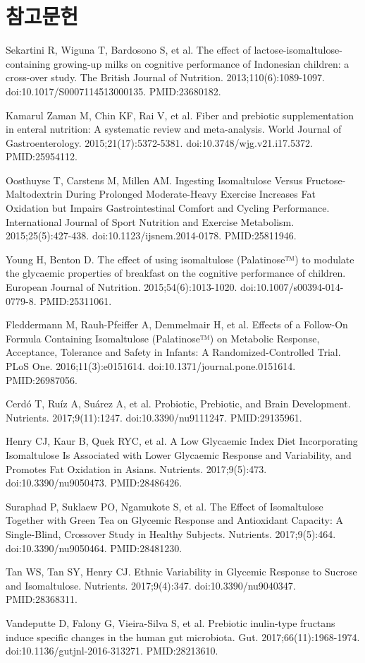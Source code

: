 \documentclass[11pt,oneside]{book}
\newcommand{\refstart}{\par\begingroup\footnotesize\setlength{\parskip}{2.5pt}\raggedright}
\newcommand{\reff}[2]{\par\hangindent=7mm\hangafter=1\noindent[#1]\hspace{2mm}#2\par}
\begin{document}
\section*{참고문헌}
\refstart
\reff{1}{Sekartini R, Wiguna T, Bardosono S, et al. The effect of lactose-isomaltulose-containing growing-up milks on cognitive performance of Indonesian children: a cross-over study. The British Journal of Nutrition. 2013;110(6):1089-1097. doi:10.1017/S0007114513000135. PMID:23680182.}
\reff{2}{Kamarul Zaman M, Chin KF, Rai V, et al. Fiber and prebiotic supplementation in enteral nutrition: A systematic review and meta-analysis. World Journal of Gastroenterology. 2015;21(17):5372-5381. doi:10.3748/wjg.v21.i17.5372. PMID:25954112.}
\reff{3}{Oosthuyse T, Carstens M, Millen AM. Ingesting Isomaltulose Versus Fructose-Maltodextrin During Prolonged Moderate-Heavy Exercise Increases Fat Oxidation but Impairs Gastrointestinal Comfort and Cycling Performance. International Journal of Sport Nutrition and Exercise Metabolism. 2015;25(5):427-438. doi:10.1123/ijsnem.2014-0178. PMID:25811946.}
\reff{4}{Young H, Benton D. The effect of using isomaltulose (Palatinose™) to modulate the glycaemic properties of breakfast on the cognitive performance of children. European Journal of Nutrition. 2015;54(6):1013-1020. doi:10.1007/s00394-014-0779-8. PMID:25311061.}
\reff{5}{Fleddermann M, Rauh-Pfeiffer A, Demmelmair H, et al. Effects of a Follow-On Formula Containing Isomaltulose (Palatinose™) on Metabolic Response, Acceptance, Tolerance and Safety in Infants: A Randomized-Controlled Trial. PLoS One. 2016;11(3):e0151614. doi:10.1371/journal.pone.0151614. PMID:26987056.}
\reff{6}{Cerdó T, Ruíz A, Suárez A, et al. Probiotic, Prebiotic, and Brain Development. Nutrients. 2017;9(11):1247. doi:10.3390/nu9111247. PMID:29135961.}
\reff{7}{Henry CJ, Kaur B, Quek RYC, et al. A Low Glycaemic Index Diet Incorporating Isomaltulose Is Associated with Lower Glycaemic Response and Variability, and Promotes Fat Oxidation in Asians. Nutrients. 2017;9(5):473. doi:10.3390/nu9050473. PMID:28486426.}
\reff{8}{Suraphad P, Suklaew PO, Ngamukote S, et al. The Effect of Isomaltulose Together with Green Tea on Glycemic Response and Antioxidant Capacity: A Single-Blind, Crossover Study in Healthy Subjects. Nutrients. 2017;9(5):464. doi:10.3390/nu9050464. PMID:28481230.}
\reff{9}{Tan WS, Tan SY, Henry CJ. Ethnic Variability in Glycemic Response to Sucrose and Isomaltulose. Nutrients. 2017;9(4):347. doi:10.3390/nu9040347. PMID:28368311.}
\reff{10}{Vandeputte D, Falony G, Vieira-Silva S, et al. Prebiotic inulin-type fructans induce specific changes in the human gut microbiota. Gut. 2017;66(11):1968-1974. doi:10.1136/gutjnl-2016-313271. PMID:28213610.}
\end{document}
